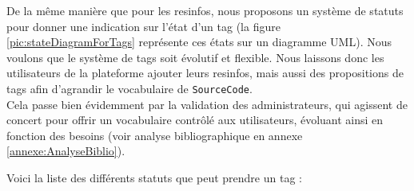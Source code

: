
De la même manière que pour les \glspl{resinfo}, nous proposons un système de statuts pour donner une indication sur l'état d'un \gls{tag} (la figure \ref{pic:stateDiagramForTags} représente ces états sur un diagramme UML). Nous voulons que le système de \glspl{tag} soit évolutif et flexible. Nous laissons donc les utilisateurs de la plateforme ajouter leurs \glspl{resinfo}, mais aussi des propositions de \glspl{tag} afin d'agrandir le vocabulaire de \texttt{SourceCode}.\\

Cela passe bien évidemment par la validation des administrateurs, qui agissent de concert pour offrir un vocabulaire contrôlé aux utilisateurs, évoluant ainsi en fonction des besoins (voir analyse bibliographique en annexe \ref{annexe:AnalyseBiblio}).

Voici la liste des différents statuts que peut prendre un \gls{tag} :

